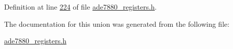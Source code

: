 Definition at line \hyperlink{a00036_source_l00224}{224} of file \hyperlink{a00036_source}{ade7880\-\_\-registers.\-h}.



The documentation for this union was generated from the following file\-:\begin{DoxyCompactItemize}
\item 
\hyperlink{a00036}{ade7880\-\_\-registers.\-h}\end{DoxyCompactItemize}
